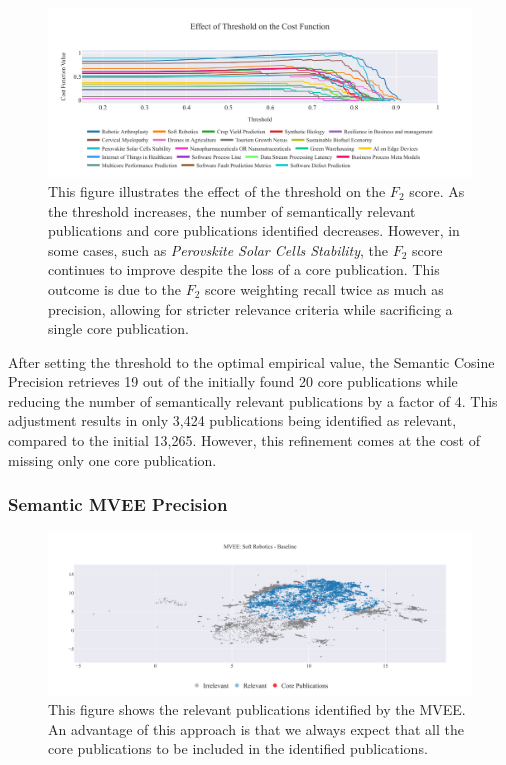 \begin{figure}[!b]
	\hspace*{-.5cm}
	\includegraphics[scale=0.58]{pics/threshold-analysis.pdf}
	\caption[Semantic Cosine Threshold: Empirical Analysis]{This figure illustrates the effect of the threshold on the $F_2$ score. As the threshold increases, the number of semantically relevant publications and core publications identified decreases. However, in some cases, such as \textit{Perovskite Solar Cells Stability}, the $F_2$ score continues to improve despite the loss of a core publication. This outcome is due to the $F_2$ score weighting recall twice as much as precision, allowing for stricter relevance criteria while sacrificing a single core publication.}\label{fig:threshold-analysis}
\end{figure}

After setting the threshold to the optimal empirical value, the Semantic Cosine Precision retrieves 19 out of the initially found 20 core publications while reducing the number of semantically relevant publications by a factor of 4. This adjustment results in only 3,424 publications being identified as relevant, compared to the initial 13,265. However, this refinement comes at the cost of missing only one core publication.

\subsubsection{Semantic MVEE Precision}
\newcommand{\eumap}{\mathop{}\!\mathrm{E_{umap}}}
\newcommand{\eo}{\mathop{}\!\mathrm{E_{o}}}
\begin{figure}
	\hspace*{-1cm}	
	\includegraphics[scale=0.45]{pics/sr-mvee-baseline.pdf}
	\caption[Semantic MVEE: Soft Robotics]{This figure shows the relevant publications identified by the MVEE. An advantage of this approach is that we always expect that all the core publications to be included in the identified publications.}\label{fig:sr-mvee-baseline}
\end{figure}

